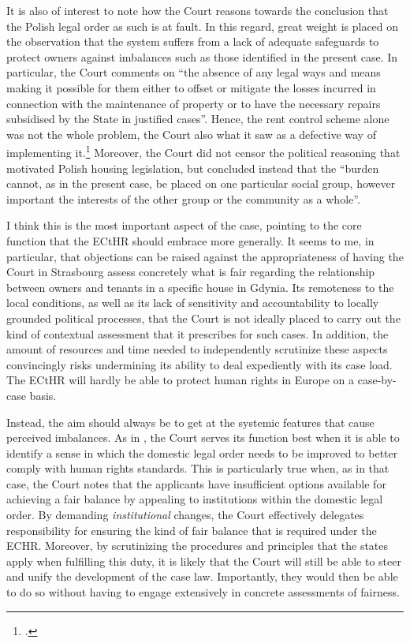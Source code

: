 It is also of interest to note how the Court reasons towards the conclusion that the Polish legal order as such is at fault. In this regard, great weight is placed on the observation that the system suffers from a lack of adequate safeguards to protect owners against imbalances such as those identified in the present case. In particular, the Court comments on ``the absence of any legal ways and means making it possible for them either to offset or mitigate the losses incurred in connection with the maintenance of property or to have the necessary repairs subsidised by the State in justified cases''. Hence, the rent control scheme alone was not the whole problem, the Court also  what it saw as a defective way of implementing it.\footcite[224]{hutten06} Moreover, the Court did not censor the political reasoning that motivated Polish housing legislation, but concluded instead that the ``burden cannot, as in the present case, be placed on one particular social group, however important the interests of the other group or the community as a whole''. 

I think this is the most important aspect of the case, pointing to the core function that the ECtHR should embrace more generally. It seems to me, in particular, that objections can be raised against the appropriateness of having the Court in Strasbourg assess concretely what is fair regarding the relationship between owners and tenants in a specific house in Gdynia. Its remoteness to the local conditions, as well as its lack of sensitivity and accountability to locally grounded political processes,  that the Court is not ideally placed to carry out the kind of contextual assessment that it prescribes for such cases. In addition, the amount of resources and time needed to independently scrutinize these aspects convincingly risks undermining its ability to deal expediently with its case load. The ECtHR will hardly be able to protect human rights in Europe on a case-by-case basis.

Instead, the aim should always be to get at the systemic features that cause perceived imbalances. As in \textcite{hutten06}, the Court serves its function best when it is able to identify a sense in which the domestic legal order needs to be improved to better comply with human rights standards. This is particularly true when, as in that case, the Court notes that the applicants have insufficient options available for achieving a fair balance by appealing to institutions within the domestic legal order. By demanding {\it institutional} changes, the Court effectively delegates responsibility for ensuring the kind of fair balance that is required under the ECHR. Moreover, by scrutinizing the procedures and principles that the states apply when fulfilling this duty, it is likely that the Court will still be able to steer and unify the development of the case law. Importantly, they would then be able to do so without having to engage extensively in concrete assessments of fairness. 

